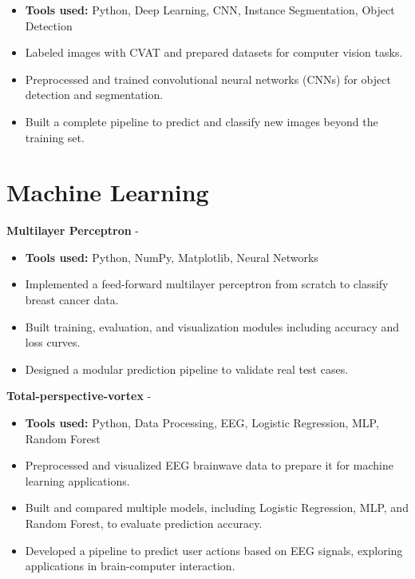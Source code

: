 \documentclass[a4paper,11pt]{article}%
\begin{document}
\begin{itemize}[leftmargin=2em,label={},parsep=0pt,topsep=1em]%
\item \textbf{Tools used:} Python, Deep Learning, CNN, Instance Segmentation, Object Detection%
\item Labeled images with CVAT and prepared datasets for computer vision tasks.%
\item Preprocessed and trained convolutional neural networks (CNNs) for object detection and segmentation.%
\item Built a complete pipeline to predict and classify new images beyond the training set.%
\end{itemize}%
\section*{Machine Learning}%
%
\noindent \textbf{Multilayer Perceptron} - \href{https://github.com/sboof911/Multilayer-Perceptron}{{}}%
\begin{itemize}[leftmargin=2em,label={},parsep=0pt,topsep=1em]%
\item \textbf{Tools used:} Python, NumPy, Matplotlib, Neural Networks%
\item Implemented a feed-forward multilayer perceptron from scratch to classify breast cancer data.%
\item Built training, evaluation, and visualization modules including accuracy and loss curves.%
\item Designed a modular prediction pipeline to validate real test cases.%
\end{itemize}%
%
\noindent \textbf{Total-perspective-vortex} - \href{https://github.com/sboof911/total-perspectivevortex}{{}}%
\begin{itemize}[leftmargin=2em,label={},parsep=0pt,topsep=1em]%
\item \textbf{Tools used:} Python, Data Processing, EEG, Logistic Regression, MLP, Random Forest%
\item Preprocessed and visualized EEG brainwave data to prepare it for machine learning applications.%
\item Built and compared multiple models, including Logistic Regression, MLP, and Random Forest, to evaluate prediction accuracy.%
\item Developed a pipeline to predict user actions based on EEG signals, exploring applications in brain-computer interaction.%
\end{itemize}%
\end{document}
